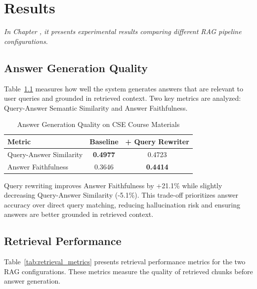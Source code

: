 \chapter{Results}
\textit{In Chapter \thechapter, it presents experimental results comparing different RAG pipeline configurations.}

\section{Answer Generation Quality}

Table~\ref{tab:answer_quality} measures how well the system generates answers that are relevant to user queries and grounded in retrieved context. Two key metrics are analyzed: Query-Answer Semantic Similarity and Answer Faithfulness.

\begin{table}[htbp]
\centering
\caption{Answer Generation Quality on CSE Course Materials}
\label{tab:answer_quality}
\begin{tabular}{|l|c|c|}
\hline
\textbf{Metric} & \textbf{Baseline} & \textbf{+ Query Rewriter} \\
\hline
Query-Answer Similarity & \textbf{0.4977} & 0.4723 \\
\hline
Answer Faithfulness & 0.3646 & \textbf{0.4414} \\
\hline
\end{tabular}
\end{table}

Query rewriting improves Answer Faithfulness by +21.1\% while slightly decreasing Query-Answer Similarity (-5.1\%). This trade-off prioritizes answer accuracy over direct query matching, reducing hallucination risk and ensuring answers are better grounded in retrieved context.

\section{Retrieval Performance}

Table~\ref{tab:retrieval_metrics} presents retrieval performance metrics for the two RAG configurations. These metrics measure the quality of retrieved chunks before answer generation.

\begin{table}[htbp]
\centering
\caption{Retrieval Performance Metrics}
\label{tab:retrieval_metrics}
\end{table}

